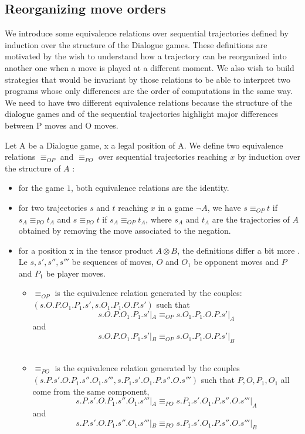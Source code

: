 \documentclass[a4paper,UKenglish]{lipics}
\begin{document}
\subsection{Reorganizing move orders}

We introduce some equivalence relations over sequential trajectories defined by induction over the structure of the Dialogue games. These definitions are motivated by the wish to understand how  a trajectory can be reorganized into another one when a move is played at a different moment. We also wish to build strategies that would be invariant by those relations to be able to interpret two programs whose only differences are the order of computations in the same way.\\

 We need to have two different equivalence relations because the structure of the dialogue games and of the sequential trajectories highlight major differences between P moves and O moves.
\begin{definition}
Let A be a Dialogue game, x a legal position of A. We define two equivalence relations $\equiv_{OP}$ and $\equiv_ {PO}$ over sequential trajectories reaching $x$ by induction over the structure of $A$ : 
\begin{itemize}
\item for the game $1$, both equivalence relations are the identity.
\item for two trajectories $s$ and $t$ reaching $x$ in a game $\neg A$, we have $s \equiv_{OP} t$ if $s_A \equiv_{PO} t_A$ and $s \equiv_{PO} t$ if $s_A \equiv_{OP} t_A$, where $s_A$ and $t_A$ are the trajectories of $A$ obtained by removing the move associated to the negation.
 
\item for a position x in the tensor product $A \otimes B$, the definitions differ a bit more . Le $s,s',s'',s'''$ be sequences of moves, $O$ and $O_1$ be opponent moves and $P$ and $P_1$ be player moves. 
\begin{itemize}
\item $\equiv_{OP}$ is the equivalence relation generated by the couples: $(s.O.P.O_1.P_1.s' , s.O_1.P_1.O.P.s')$ such that $$s.O.P.O_1.P_1.s'|_A \equiv_{OP} s.O_1.P_1.O.P.s'|_A$$ and $$s.O.P.O_1.P_1.s'|_B \equiv_{OP} s.O_1.P_1.O.P.s'|_B$$ \\

\item $ \equiv_{PO}$ is the equivalence relation generated by the couples $(s.P.s'.O.P_1.s''.O_1.s''', s.P_1.s'.O_1.P.s''.O.s''')$ such that $P,O,P_1,O_1$ all come from the same component,  $$s.P.s'.O.P_1.s''.O_1.s'''|_A \equiv_{PO} s.P_1.s'.O_1.P.s''.O.s'''|_A$$ and $$s.P.s'.O.P_1.s''.O_1.s'''|_B \equiv_{PO} s.P_1.s'.O_1.P.s''.O.s'''|_B$$\\

\end{itemize}
\end{itemize} 
\end{definition}
\end{document}
